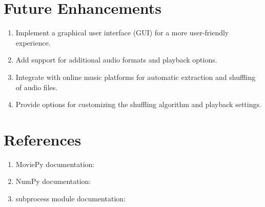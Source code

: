 \documentclass{article}
\begin{document}
\section{Future Enhancements}
\begin{enumerate}
  \item Implement a graphical user interface (GUI) for a more user-friendly experience.
  \item Add support for additional audio formats and playback options.
  \item Integrate with online music platforms for automatic extraction and shuffling of audio files.
  \item Provide options for customizing the shuffling algorithm and playback settings.
\end{enumerate}

\section{References}
\begin{enumerate}
  \item MoviePy documentation: 
  \item NumPy documentation: 
  \item subprocess module documentation: 
\end{enumerate}
\end{document}
